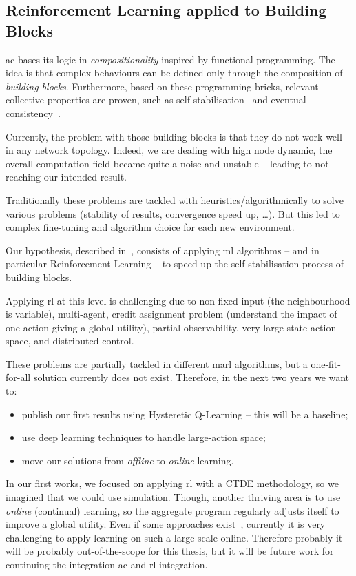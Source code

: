 \documentclass[11pt]{article}
\begin{document}
\subsection{Reinforcement Learning applied to Building Blocks}\label{rl-future}
\ac{ac} bases its logic in \textit{compositionality} inspired by functional programming. The idea is that complex behaviours can be defined only through the composition of \emph{building blocks}. Furthermore, based on these programming bricks, relevant collective properties are proven, such as self-stabilisation~\cite{DBLP:journals/corr/abs-1711-08297} and eventual consistency~\cite{DBLP:conf/saso/BealVPD16}. 

Currently, the problem with those building blocks is that they do not work well in any network topology. Indeed, we are dealing with high node dynamic, the overall computation field became quite a noise and unstable -- leading to not reaching our intended result.

Traditionally these problems are tackled with heuristics/algorithmically to solve various problems (stability of results, convergence speed up, \dots{}). But this led to complex fine-tuning and algorithm choice for each new environment.

Our hypothesis, described in~\cite{research}, consists of applying \ac{ml} algorithms -- and in particular Reinforcement Learning --
to speed up the self-stabilisation process of building blocks.

Applying \ac{rl} at this level is challenging due to non-fixed input (the neighbourhood is variable), multi-agent, credit assignment problem (understand the impact of one action giving a global utility), partial observability, very large state-action space, and distributed control.

These problems are partially tackled in different \ac{marl} algorithms, but a one-fit-for-all solution currently does not exist. Therefore, in the next two years we want to:
\begin{itemize}
	\item publish our first results using Hysteretic Q-Learning -- this will be a baseline;
	\item use deep learning techniques to handle large-action space;
	\item move our solutions from \emph{offline} to \emph{online} learning. 
\end{itemize}
In our first works, we focused on applying \ac{rl} with a CTDE methodology, so we imagined that we could use simulation.
Though, another thriving area is to use \emph{online} (continual) learning, so the aggregate program regularly adjusts itself to improve a global utility. Even if some approaches exist~\cite{DBLP:conf/icml/OmidshafieiPAHV17}, currently it is very challenging to apply learning on such a large scale online. Therefore probably it will be probably out-of-the-scope for this thesis, but it will be future work for continuing the integration \ac{ac} and \ac{rl} integration. 
\end{document}
